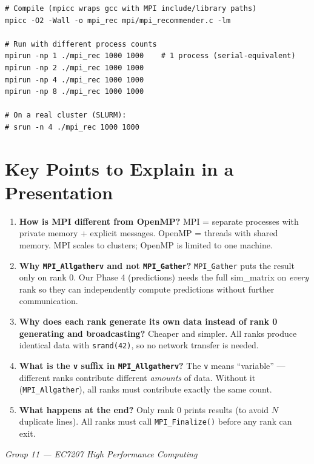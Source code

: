 \documentclass[12pt,a4paper]{article}
\begin{document}
\begin{verbatim}
# Compile (mpicc wraps gcc with MPI include/library paths)
mpicc -O2 -Wall -o mpi_rec mpi/mpi_recommender.c -lm

# Run with different process counts
mpirun -np 1 ./mpi_rec 1000 1000    # 1 process (serial-equivalent)
mpirun -np 2 ./mpi_rec 1000 1000
mpirun -np 4 ./mpi_rec 1000 1000
mpirun -np 8 ./mpi_rec 1000 1000

# On a real cluster (SLURM):
# srun -n 4 ./mpi_rec 1000 1000
\end{verbatim}

\section{Key Points to Explain in a Presentation}

\begin{enumerate}
    \item \textbf{How is MPI different from OpenMP?}  MPI = separate processes
          with private memory + explicit messages.  OpenMP = threads with shared
          memory.  MPI scales to clusters; OpenMP is limited to one machine.
    \item \textbf{Why \texttt{MPI\_Allgatherv} and not \texttt{MPI\_Gather}?}
          \texttt{MPI\_Gather} puts the result only on rank 0.  Our Phase 4
          (predictions) needs the full sim\_matrix on \emph{every} rank so they
          can independently compute predictions without further communication.
    \item \textbf{Why does each rank generate its own data instead of rank 0
          generating and broadcasting?}  Cheaper and simpler.  All ranks produce
          identical data with \texttt{srand(42)}, so no network transfer is needed.
    \item \textbf{What is the \texttt{v} suffix in \texttt{MPI\_Allgatherv}?}
          The \texttt{v} means ``variable'' — different ranks contribute different
          \emph{amounts} of data.  Without it (\texttt{MPI\_Allgather}), all
          ranks must contribute exactly the same count.
    \item \textbf{What happens at the end?}  Only rank 0 prints results (to
          avoid $N$ duplicate lines).  All ranks must call \texttt{MPI\_Finalize()}
          before any rank can exit.
\end{enumerate}

\vfill
\begin{center}
    \small\textit{Group 11 — EC7207 High Performance Computing}
\end{center}
\end{document}
